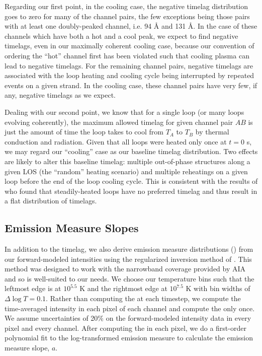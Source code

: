 Regarding our first point, in the cooling case, the negative timelag distribution goes to zero for many of the channel pairs, the few exceptions being those pairs with at least one doubly-peaked channel, i.e. 94 \AA{} and 131 \AA{}. In the case of these channels which have both a hot and a cool peak, we expect to find negative timelags, even in our maximally coherent cooling case, because our convention of ordering the ``hot'' channel first has been violated such that cooling plasma can lead to negative timelags. For the remaining channel pairs, negative timelags are associated with the loop heating and cooling cycle being interrupted by repeated events on a given strand. In the cooling case, these channel pairs have very few, if any, negative timelags as we expect. 

Dealing with our second point, we know that for a single loop (or many loops evolving coherently), the maximum allowed timelag for given channel pair $AB$ is just the amount of time the loop takes to cool from $T_A$ to $T_B$ by thermal conduction and radiation. Given that all loops were heated only once at $t=0$ s, we may regard our ``cooling'' case as our baseline timelag distribution. Two effects are likely to alter this baseline timelag: multiple out-of-phase structures along a given LOS (the ``random'' heating scenario) and multiple reheatings on a given loop before the end of the loop cooling cycle. This is consistent with the results of \citet{viall_signatures_2016} who found that steadily-heated loops have no preferred timelag and thus result in a flat distribution of timelags. 

\subsection{Emission Measure Slopes}\label{em_slopes}

In addition to the timelag, we also derive emission measure distributions (\dem{}) from our forward-modeled intensities using the regularized inversion method of \citet{hannah_differential_2012}. This method was designed to work with the narrowband coverage provided by AIA and so is well-suited to our needs. We choose our temperature bins such that the leftmost edge is at $10^{5.5}$ K and the rightmost edge at $10^{7.5}$ K with bin widths of $\Delta\log T=0.1$. Rather than computing the \dem{} at each timestep, we compute the time-averaged intensity in each pixel of each channel and compute the \dem{} only once. We assume uncertainties of 20\% on the forward-modeled intensity data in every pixel and every channel. After computing the \dem{} in each pixel, we do a first-order polynomial fit to the log-transformed emission measure to calculate the emission measure slope, $a$.

